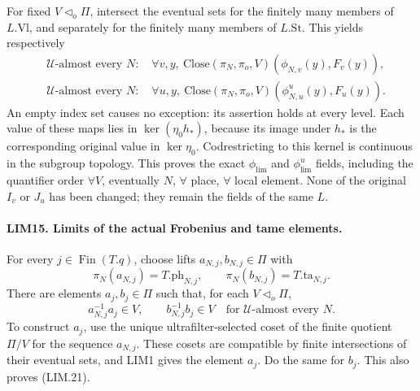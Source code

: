 For fixed \(V\triangleleft_o\Pi\), intersect the eventual sets
for the finitely many members of \(L.\mathrm{Vl}\), and separately
for the finitely many members of \(L.\mathrm{St}\).
This yields respectively
\[
 \begin{split}
 &\mathcal U\text{-almost every }N:\quad
   \forall v,y,\ \mathrm{Close}(\pi_N,\pi_o,V)
                 (\phi_{N,v}(y),F_v(y)),\\
 &\mathcal U\text{-almost every }N:\quad
   \forall u,y,\ \mathrm{Close}(\pi_N,\pi_o,V)
                 (\phi^u_{N,u}(y),F_u(y)).
 \end{split}
 \tag{LIM.20}
\]
An empty index set causes no exception: its assertion holds at every
level.  Each value of these maps lies in
\(\ker(\eta_0h_*)\), because its image under \(h_*\) is the
corresponding original value in \(\ker\eta_0\).
Codrestricting to this kernel is continuous in the subgroup topology.
This proves the exact \(\phi_{\mathrm{lim}}\) and
\(\phi^u_{\mathrm{lim}}\) fields, including the quantifier order
\(\forall V\), eventually \(N\), \(\forall\) place, \(\forall\)
local element.  None of the original \(I_v\) or \(J_u\) has been
changed; they remain the fields of the same \(L\).

\paragraph{LIM15. Limits of the actual Frobenius and tame elements.}
\label{claim:LIM15}
For every \(j\in\operatorname{Fin}(T.q)\), choose lifts
\(a_{N,j},b_{N,j}\in\Pi\) with
\[
 \pi_N(a_{N,j})=T.\mathrm{ph}_{N,j},\qquad
 \pi_N(b_{N,j})=T.\mathrm{ta}_{N,j}.
\]
There are elements \(a_j,b_j\in\Pi\) such that, for each
\(V\triangleleft_o\Pi\),
\[
 a_{N,j}^{-1}a_j\in V,\qquad b_{N,j}^{-1}b_j\in V
 \quad\text{for }\mathcal U\text{-almost every }N.
 \tag{LIM.21}
\]
To construct \(a_j\), use the unique ultrafilter-selected coset
of the finite quotient \(\Pi/V\) for the sequence \(a_{N,j}\).
These cosets are compatible by finite intersections of their
eventual sets, and LIM1 gives the element \(a_j\).
Do the same for \(b_j\).  This also proves (LIM.21).

